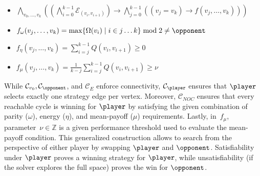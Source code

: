 \documentclass[runningheads]{llncs}
\begin{document}
\begin{definition}
\begin{itemize}[leftmargin=2.1cm, labelwidth=1.7cm, align=left, itemsep=1.0ex, parsep=0pt]
        

        \item [$\mathcal{C}_{NOC}(f)$ :] $\bigwedge_{v_0, \dots, v_k} \left( \left(\bigwedge_{i=0}^{k-1} \mathcal{E}_{(v_i,v_{i+1})}\right) \to \bigwedge_{j=0}^{k-1} ((v_j = v_k) \to f(v_j, \dots, v_k)) \right)$

    \end{itemize}
    \begin{itemize}[itemsep=1.0ex, parsep=0pt]
        \item $f_\omega(v_j, \dots, v_k) = \max\{\Omega(v_i) \mid i\in j\dots k\} \bmod 2 \ne \opponent$

        \item $f_\eta(v_j, \dots, v_k) = \sum_{i=j}^{k-1} Q(v_i, v_{i+1}) \ge 0$

        \item $f_\mu(v_j, \dots, v_k) = \frac{1}{k-j} \sum_{i=j}^{k-1} Q(v_i, v_{i+1}) \ge \nu$
    \end{itemize}
\end{definition}

While $\mathcal{C}_{v_0}, \mathcal{C}_{\opponent}$, and $\mathcal{C}_{\!E}$ %
enforce connectivity, 
$\mathcal{C}_{\player}$ ensures that $\player$ selects exactly one strategy edge per vertex.  
Moreover, $\mathcal{C}_{\!N\!O\!C}$ ensures that every reachable cycle is winning for $\player$ by satisfying the given combination of parity ($\omega$), energy ($\eta$), and mean-payoff ($\mu$) requirements. Lastly, in~$f_\mu$, parameter~$\nu \in \mathbb{Z}$ is a given performance threshold used to evaluate the mean-payoff condition. This generalized construction allows \nocq to search from the perspective of either player by swapping $\player$ and $\opponent$. Satisfiability under $\player$ proves a winning strategy for $\player$, while unsatisfiability (if the solver explores the full space) proves the win for $\opponent$.
\end{document}
